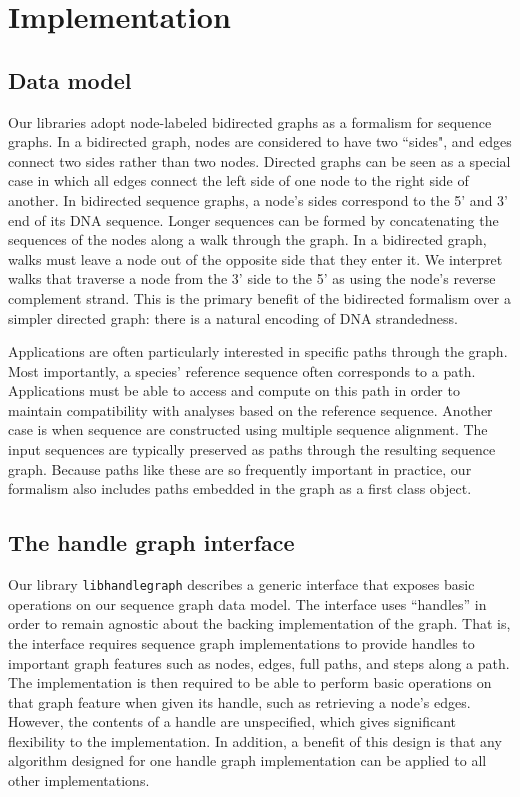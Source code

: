 \documentclass{article}
\begin{document}
\section{Implementation}

\subsection{Data model}

Our libraries adopt node-labeled bidirected graphs as a formalism for sequence graphs. In a bidirected graph, nodes are considered to have two ``sides", and edges connect two sides rather than two nodes. Directed graphs can be seen as a special case in which all edges connect the left side of one node to the right side of another. In bidirected sequence graphs, a node's sides correspond to the 5' and 3' end of its DNA sequence.  Longer sequences can be formed by concatenating the sequences of the nodes along a walk through the graph. In a bidirected graph, walks must leave a node out of the opposite side that they enter it. We interpret walks that traverse a node from the 3' side to the 5' as using the node's reverse complement strand. This is the primary benefit of the bidirected formalism over a simpler directed graph: there is a natural encoding of DNA strandedness.

Applications are often particularly interested in specific paths through the graph. Most importantly, a species' reference sequence often corresponds to a path. Applications must be able to access and compute on this path in order to maintain compatibility with analyses based on the reference sequence. Another case is when sequence are constructed using multiple sequence alignment. The input sequences are typically preserved as paths through the resulting sequence graph. Because paths like these are so frequently important in practice, our formalism also includes paths embedded in the graph as a first class object.

\subsection{The handle graph interface}

Our library \texttt{libhandlegraph} describes a generic interface that exposes basic operations on our sequence graph data model. The interface uses ``handles'' in order to remain agnostic about the backing implementation of the graph. That is, the interface requires sequence graph implementations to provide handles to important graph features such as nodes, edges, full paths, and steps along a path. The implementation is then required to be able to perform basic operations on that graph feature when given its handle, such as retrieving a node's edges. However, the contents of a handle are unspecified, which gives significant flexibility to the implementation. In addition, a benefit of this design is that any algorithm designed for one handle graph implementation can be applied to all other implementations.
\end{document}
